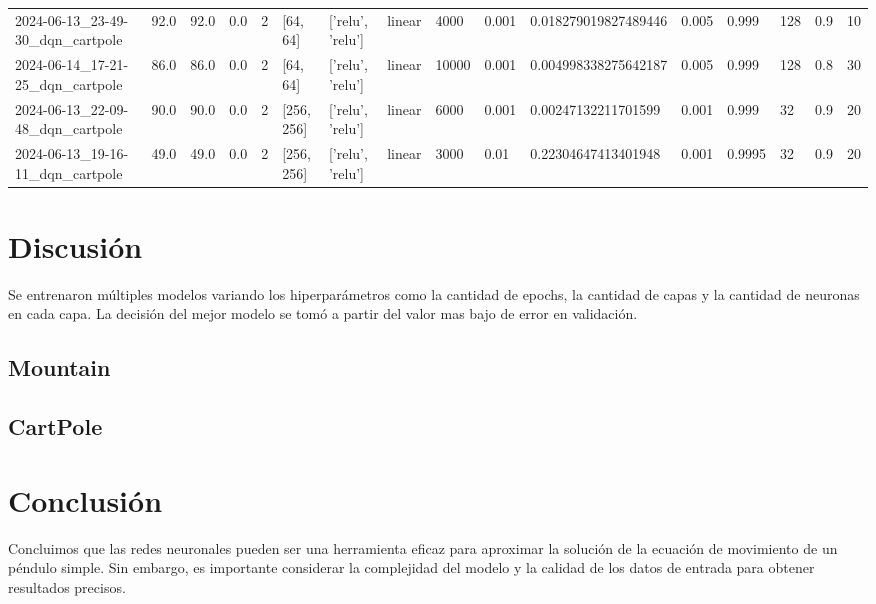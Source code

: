 \documentclass[a4paper,12pt]{article}
\begin{document}
\begin{table}[]
\begin{tabular}{llllllllllllllll}
    2024-06-13\_23-49-30\_dqn\_cartpole & 92.0                  & 92.0                    & 0.0                    & 2              & {[}64, 64{]}             & {[}'relu', 'relu'{]}                 & linear                    & 4000          & 0.001          & 0.018279019827489446 & 0.005        & 0.999          & 128         & 0.9      & 10                    \\
    2024-06-14\_17-21-25\_dqn\_cartpole & 86.0                  & 86.0                    & 0.0                    & 2              & {[}64, 64{]}             & {[}'relu', 'relu'{]}                 & linear                    & 10000         & 0.001          & 0.004998338275642187 & 0.005        & 0.999          & 128         & 0.8      & 30                    \\
    2024-06-13\_22-09-48\_dqn\_cartpole & 90.0                  & 90.0                    & 0.0                    & 2              & {[}256, 256{]}           & {[}'relu', 'relu'{]}                 & linear                    & 6000          & 0.001          & 0.00247132211701599  & 0.001        & 0.999          & 32          & 0.9      & 20                    \\
    2024-06-13\_19-16-11\_dqn\_cartpole & 49.0                  & 49.0                    & 0.0                    & 2              & {[}256, 256{]}           & {[}'relu', 'relu'{]}                 & linear                    & 3000          & 0.01           & 0.22304647413401948  & 0.001        & 0.9995         & 32          & 0.9      & 20
    \end{tabular}
    \end{table}

\section{Discusión}
Se entrenaron múltiples modelos variando los hiperparámetros como la cantidad de epochs, la cantidad de capas y la cantidad de neuronas en cada capa. La decisión del mejor modelo se tomó a partir del valor mas bajo de error en validación.

\subsection*{Mountain}


\subsection*{CartPole}


\section{Conclusión}
Concluimos que las redes neuronales pueden ser una herramienta eficaz para aproximar la solución de la ecuación de movimiento de un péndulo simple. Sin embargo, es importante considerar la complejidad del modelo y la calidad de los datos de entrada para obtener resultados precisos.
\end{document}
